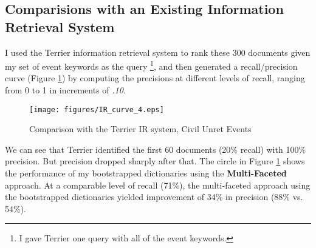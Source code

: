 





\subsection{Comparisions with an Existing Information Retrieval System}

I used the Terrier information retrieval system to rank these 300 documents given my set of event keywords 
as the query \footnote{I gave Terrier one query with all of the event keywords.}, 
and then generated a
recall/precision curve (Figure \ref{IR-curve}) 
by computing the precisions at different levels of recall,
ranging from 0 to 1 in increments of {\it .10}.  
\begin{figure}[htbp]
 \centering
 \texttt{[image: figures/IR\_curve\_4.eps]}
 \caption{Comparison with the Terrier IR system, Civil Unret Events}
\label{IR-curve}
\end{figure} 
We can see that Terrier
identified the first 60 documents (20\% recall) with 100\%
precision.  But precision dropped sharply after that.  The circle in
Figure \ref{IR-curve} shows the performance of my bootstrapped
dictionaries using the {\bf Multi-Faceted} approach.
At a comparable level of recall (71\%), 
the multi-faceted approach using the bootstrapped
dictionaries yielded improvement of 34\% in precision (88\% vs. 54\%). 



